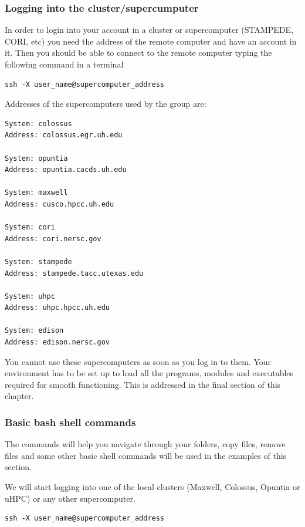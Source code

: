 \documentclass[11pt]{article}
\begin{document}
\subsubsection{Logging into the cluster/supercumputer}
\label{sec:orgdc647bd}
In order to login into your account in a cluster or supercomputer (STAMPEDE, CORI, etc) you need the address of the remote computer and have an account in it. Then you should be able to connect to the remote computer typing the following command in a terminal
\begin{verbatim}
ssh -X user_name@supercomputer_address
\end{verbatim}

Addresses of the supercomputers used by the group are:
\begin{verbatim}
System: colossus
Address: colossus.egr.uh.edu

System: opuntia
Address: opuntia.cacds.uh.edu

System: maxwell 
Address: cusco.hpcc.uh.edu

System: cori
Address: cori.nersc.gov

System: stampede
Address: stampede.tacc.utexas.edu

System: uhpc
Address: uhpc.hpcc.uh.edu

System: edison
Address: edison.nersc.gov
\end{verbatim}

You cannot use these supercomputers as soon as you log in to them. Your environment has to be set up to load all the programs, modules and executables required for smooth functioning. This is addressed in the final section of this chapter. 

\subsubsection{Basic bash shell commands}
\label{sec:orgd02c346}
The commands will help you navigate through your folders, copy files, remove files and some other basic shell commands will be used in the examples of this section. 

We will start logging into one of the local clusters (Maxwell, Colossus, Opuntia or uHPC) or any other supercomputer.
\begin{verbatim}
ssh -X user_name@supercomputer_address
\end{verbatim}
\end{document}
